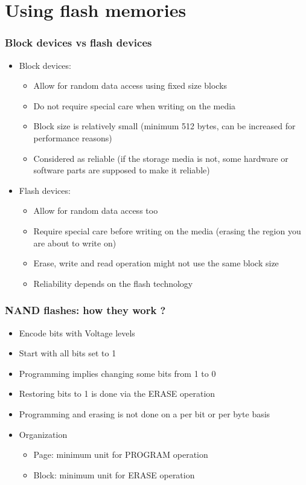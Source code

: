 \section{Using flash memories}

\begin{frame}
  \frametitle{Block devices vs flash devices}
  \begin{itemize}
  \item Block devices:
    \begin{itemize}
    \item Allow for random data access using fixed size blocks
    \item Do not require special care when writing on the media
    \item Block size is relatively small (minimum 512 bytes, can be
      increased for performance reasons)
    \item Considered as reliable (if the storage media is not, some
      hardware or software parts are supposed to make it reliable)
    \end{itemize}
  \item Flash devices:
    \begin{itemize}
    \item Allow for random data access too
    \item Require special care before writing on the media (erasing
      the region you are about to write on)
    \item Erase, write and read operation might not use the same block
      size
    \item Reliability depends on the flash technology
    \end{itemize}
  \end{itemize}
\end{frame}

\begin{frame}
  \frametitle{NAND flashes: how they work ?}
  \begin{itemize}
  \item Encode bits with Voltage levels
  \item Start with all bits set to 1
  \item Programming implies changing some bits from 1 to 0
  \item Restoring bits to 1 is done via the ERASE operation
  \item Programming and erasing is not done on a per bit or per byte
    basis
  \item Organization
    \begin{itemize}
    \item Page: minimum unit for PROGRAM operation
    \item Block: minimum unit for ERASE operation
    \end{itemize}
  \end{itemize}
\end{frame}

